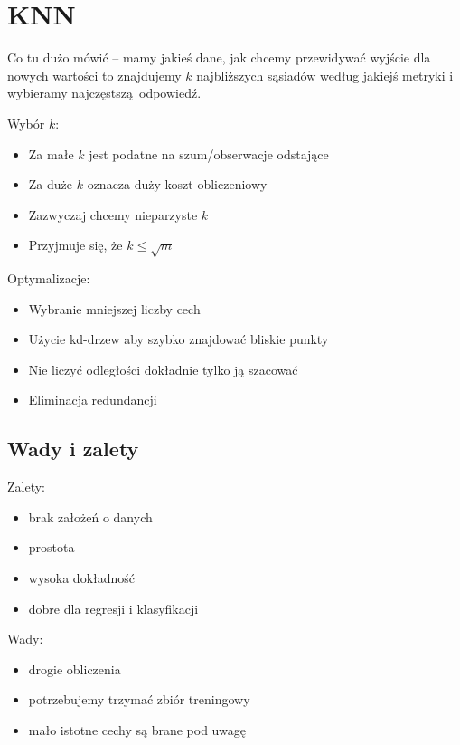 \section{KNN}

Co tu dużo mówić -- mamy jakieś dane, jak chcemy przewidywać wyjście dla nowych wartości to znajdujemy \( k \) najbliższych sąsiadów według jakiejś metryki i wybieramy najczęstszą odpowiedź.

Wybór \( k \):
\begin{itemize}
    \item Za małe \( k \) jest podatne na szum/obserwacje odstające
    \item Za duże \( k \) oznacza duży koszt obliczeniowy
    \item Zazwyczaj chcemy nieparzyste \( k \)
    \item Przyjmuje się, że \( k \leq \sqrt{m} \)
\end{itemize}

Optymalizacje:
\begin{itemize}
    \item Wybranie mniejszej liczby cech
    \item Użycie kd-drzew aby szybko znajdować bliskie punkty
    \item Nie liczyć odległości dokładnie tylko ją szacować
    \item Eliminacja redundancji
\end{itemize}

\subsection{Wady i zalety}

Zalety:
\begin{itemize}
    \item brak założeń o danych
    \item prostota
    \item wysoka dokładność
    \item dobre dla regresji i klasyfikacji
\end{itemize}

Wady:
\begin{itemize}
    \item drogie obliczenia
    \item potrzebujemy trzymać zbiór treningowy
    \item mało istotne cechy są brane pod uwagę
\end{itemize}
